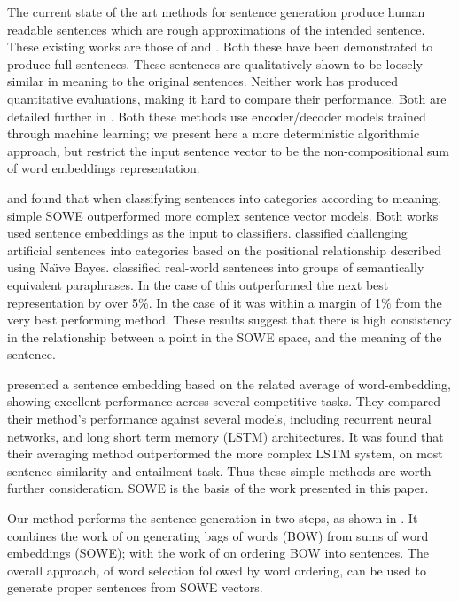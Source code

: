 \documentclass[compsoc]{IEEEtran}
\theoremstyle{plain}
\theoremstyle{definition}
\begin{document}
The current state of the art methods for sentence generation produce human readable sentences which are rough approximations of the intended sentence. These existing works are those of  \textcite{iyyer2014generating} and \textcite{Bowman2015SmoothGeneration}. Both these have been demonstrated to produce full sentences. These sentences are qualitatively shown to be loosely similar in meaning to the original sentences. Neither work has produced quantitative evaluations, making it hard to compare their performance. Both are detailed further in . Both these methods use encoder/decoder models trained through machine learning; we present here a more deterministic algorithmic approach, but restrict the input sentence vector to be the non-compositional sum of word embeddings representation.

\textcite{RitterPosition} and \textcite{White2015SentVecMeaning} found that when classifying sentences into categories according to meaning, simple SOWE outperformed more complex sentence vector models. Both works used sentence embeddings as the input to classifiers. \textcite{RitterPosition} classified challenging artificial sentences into categories based on the positional relationship described using Na{\"\i}ve Bayes. \textcite{White2015SentVecMeaning} classified real-world sentences into groups of semantically equivalent paraphrases. In the case of \textcite{RitterPosition} this outperformed the next best representation by over 5\%. In the case of \textcite{White2015SentVecMeaning} it was within a margin of 1\% from the very best performing method. These results suggest that there is high consistency in the relationship between a point in the SOWE space, and the meaning of the sentence. 

\textcite{wieting2015towards} presented a sentence embedding based on the related average of  word-embedding, showing excellent performance across several competitive tasks. They compared their method's performance against several models, including recurrent neural networks, and long short term memory (LSTM) architectures. It was found that their averaging method outperformed the more complex LSTM system, on most sentence similarity and entailment task. Thus these simple methods are worth further consideration. SOWE is the basis of the work presented in this paper.


Our method performs the sentence generation in two steps, as shown in . It combines the work of \textcite{White2015BOWgen} on generating bags of words (BOW) from sums of word embeddings (SOWE); with the work of \textcite{Horvat2014} on ordering BOW into sentences. The overall approach, of word selection followed by word ordering, can be used to generate proper sentences from SOWE vectors.
\end{document}
